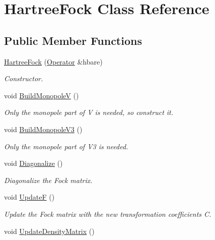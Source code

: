 \hypertarget{classHartreeFock}{}\section{Hartree\+Fock Class Reference}
\label{classHartreeFock}
\subsection*{Public Member Functions}
\begin{DoxyCompactItemize}
\item 
\mbox{\label{classHartreeFock_ad39d695b75dc9c6aa2f0e1ff81d1adc5}} 
\hyperlink{classHartreeFock_ad39d695b75dc9c6aa2f0e1ff81d1adc5}{Hartree\+Fock} (\hyperlink{classOperator}{Operator} \&hbare)
\begin{DoxyCompactList}\small\item\em Constructor. \end{DoxyCompactList}\item 
void \hyperlink{classHartreeFock_a3d6bac9b4403e4bc599a89ad0c9b6056}{Build\+MonopoleV} ()
\begin{DoxyCompactList}\small\item\em Only the monopole part of V is needed, so construct it. \end{DoxyCompactList}\item 
void \hyperlink{classHartreeFock_a1c146af25a09f427cc626d877ec6e518}{Build\+Monopole\+V3} ()
\begin{DoxyCompactList}\small\item\em Only the monopole part of V3 is needed. \end{DoxyCompactList}\item 
void \hyperlink{classHartreeFock_a00f7b0c4cb7373a3f1a69ca27a4dfaed}{Diagonalize} ()
\begin{DoxyCompactList}\small\item\em Diagonalize the Fock matrix. \end{DoxyCompactList}\item 
void \hyperlink{classHartreeFock_a84fe0eb16f6e5835c920bf8fa98c4442}{UpdateF} ()
\begin{DoxyCompactList}\small\item\em Update the Fock matrix with the new transformation coefficients C. \end{DoxyCompactList}\item 
void \hyperlink{classHartreeFock_aad38c905e7e9f9e9757b5800e6910c61}{Update\+Density\+Matrix} ()

\end{DoxyCompactItemize}
